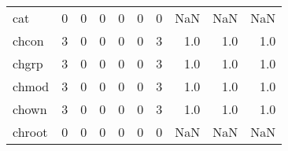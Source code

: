 \begin{longtable}{lrrrrrrrrr}
cat       &                                       0 &                                                  0 &                                                  0 &                                                  0 &                                                  0 &                                                  0 &                                                NaN &                                    NaN &                                  NaN \\
chcon     &                                       3 &                                                  0 &                                                  0 &                                                  0 &                                                  0 &                                                  3 &                                                1.0 &                                    1.0 &                                  1.0 \\
chgrp     &                                       3 &                                                  0 &                                                  0 &                                                  0 &                                                  0 &                                                  3 &                                                1.0 &                                    1.0 &                                  1.0 \\
chmod     &                                       3 &                                                  0 &                                                  0 &                                                  0 &                                                  0 &                                                  3 &                                                1.0 &                                    1.0 &                                  1.0 \\
chown     &                                       3 &                                                  0 &                                                  0 &                                                  0 &                                                  0 &                                                  3 &                                                1.0 &                                    1.0 &                                  1.0 \\
chroot    &                                       0 &                                                  0 &                                                  0 &                                                  0 &                                                  0 &                                                  0 &                                                NaN &                                    NaN &                                  NaN \\

\end{longtable}
